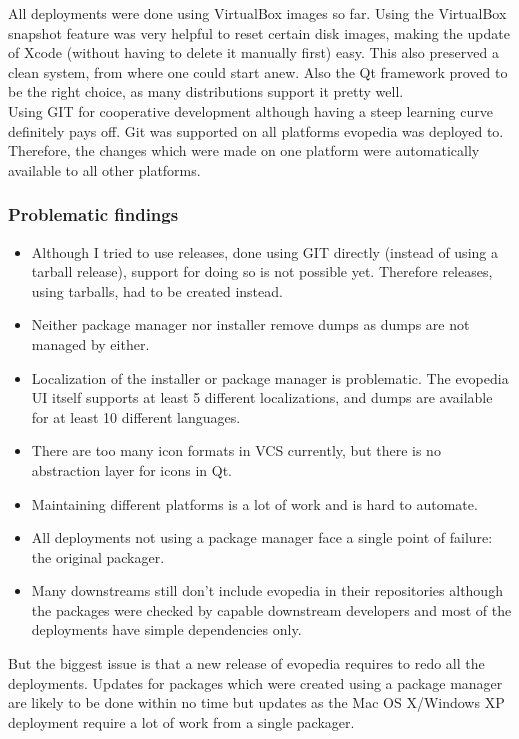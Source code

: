 \documentclass[a4paper,10pt]{article}
\begin{document}
All deployments were done using VirtualBox images so far. Using the VirtualBox snapshot feature was very helpful to reset certain disk images, making the update of Xcode (without having to delete it manually first) easy. This also preserved a clean system, from where one could start anew. Also the Qt framework proved to be the right choice, as many distributions support it pretty well. \\

Using GIT for cooperative development although having a steep learning curve definitely pays off. Git was supported on all platforms evopedia was deployed to. Therefore, the changes which were made on one platform were automatically available to all other platforms.

\subsubsection*{Problematic findings}
\begin{itemize}
\item Although I tried to use releases, done using GIT directly (instead of using a tarball release), support for doing so is not possible yet. Therefore releases, using tarballs, had to be created instead.
\item Neither package manager nor installer remove dumps as dumps are not managed by either.
\item Localization of the installer or package manager is problematic. The evopedia UI itself supports at least 5 different localizations, and dumps are available for at least 10 different languages.
\item There are too many icon formats in VCS currently, but there is no abstraction layer for icons in Qt.
\item Maintaining different platforms is a lot of work and is hard to automate.
\item All deployments not using a package manager face a single point of failure: the original packager.
\item Many downstreams still don't include evopedia in their repositories although the packages were checked by capable downstream developers and most of the deployments have simple dependencies only.
\end{itemize}
But the biggest issue is that a new release of evopedia requires to redo all the deployments. Updates for packages which were created using a package manager are likely to be done within no time but updates as the Mac OS X/Windows XP deployment require a lot of work from a single packager.
\end{document}
